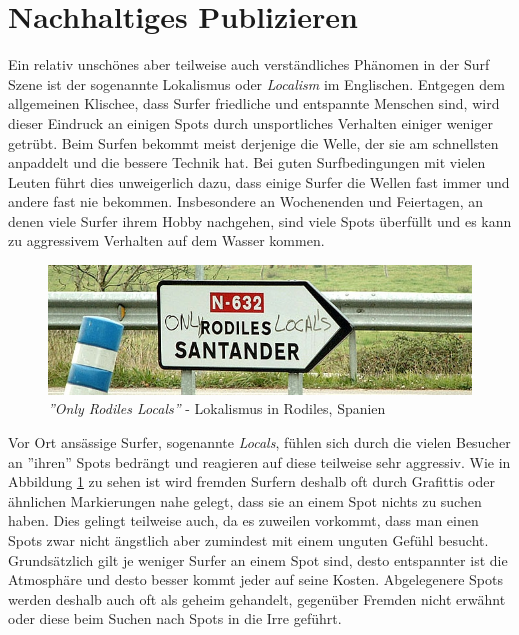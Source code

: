 \section{Nachhaltiges Publizieren}
Ein relativ unschönes aber teilweise auch verständliches Phänomen in
der Surf Szene ist der sogenannte Lokalismus oder \textit{Localism} im
Englischen. Entgegen dem allgemeinen Klischee, dass Surfer friedliche
und entspannte Menschen sind, wird dieser Eindruck an einigen Spots
durch unsportliches Verhalten einiger weniger getrübt. Beim Surfen
bekommt meist derjenige die Welle, der sie am schnellsten anpaddelt
und die bessere Technik hat. Bei guten Surfbedingungen mit vielen
Leuten führt dies unweigerlich dazu, dass einige Surfer die Wellen
fast immer und andere fast nie bekommen. Insbesondere an Wochenenden
und Feiertagen, an denen viele Surfer ihrem Hobby nachgehen, sind
viele Spots überfüllt und es kann zu aggressivem Verhalten auf dem
Wasser kommen. 

\begin{figure}[h]
  \begin{center}
    \includegraphics[width=\textwidth]{bilder/locals-only}
    \caption{\textit{''Only Rodiles Locals''} - Lokalismus in Rodiles,
      Spanien}
    \label{locals-only}
  \end{center}
\end{figure}

Vor Ort ansässige Surfer, sogenannte \textit{Locals}, fühlen sich
durch die vielen Besucher an ''ihren'' Spots bedrängt und reagieren
auf diese teilweise sehr aggressiv. Wie in Abbildung \ref{locals-only}
zu sehen ist wird fremden Surfern deshalb oft durch Grafittis oder
ähnlichen Markierungen nahe gelegt, dass sie an einem Spot nichts zu
suchen haben. Dies gelingt teilweise auch, da es zuweilen vorkommt,
dass man einen Spots zwar nicht ängstlich aber zumindest mit einem
unguten Gefühl besucht. Grundsätzlich gilt je weniger Surfer an einem
Spot sind, desto entspannter ist die Atmosphäre und desto besser kommt
jeder auf seine Kosten. Abgelegenere Spots werden deshalb auch oft als
geheim gehandelt, gegenüber Fremden nicht erwähnt oder diese beim
Suchen nach Spots in die Irre geführt.

